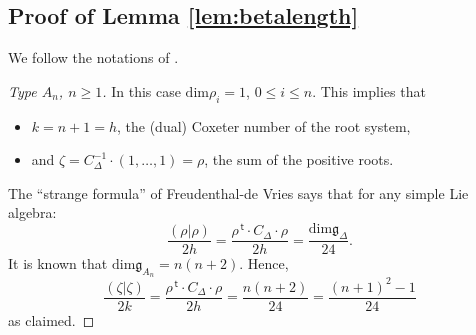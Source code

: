 \documentclass{article}
\theoremstyle{definition}
\renewcommand{\top}{\,\mathsf{t}}
\begin{document}
\subsection{Proof of Lemma \ref{lem:betalength}}
\label{sec:app1}
We follow the notations of \cite{bourbaki2002lie}. %
\begin{proof}[Type $A_n$, $n \geq 1$]
	\label{sec:app11}
	In this case $\mathrm{dim} \rho_i = 1$, $0 \leq i \leq n$. This implies that 
	\begin{itemize}
		\item $k=n+1=h$, the (dual) Coxeter number of the root system,
		\item and $\zeta = C_{\Delta}^{-1} \cdot (1,\dots,1)= \rho$, the sum of the positive roots.
	\end{itemize}
	The ``strange formula'' of Freudenthal-de Vries \cite{freudenthal1969linear} says that for any simple Lie algebra:
	\[ \frac{(\rho|\rho)}{2h}=\frac{\rho^{\top} \cdot C_\Delta \cdot \rho}{2h}=\frac{\mathrm{dim} \mathfrak{g}_{\Delta}}{24}. \]
	It is known that $\mathrm{dim} \mathfrak{g}_{A_n}= n(n+2)$. Hence,
	\[ \frac{(\zeta|\zeta)}{2k}=\frac{\rho^{\top} \cdot C_\Delta \cdot \rho}{2h}=\frac{n(n+2)}{24}=\frac{(n+1)^2-1}{24} \]
	as claimed.
\end{proof}
\end{document}
